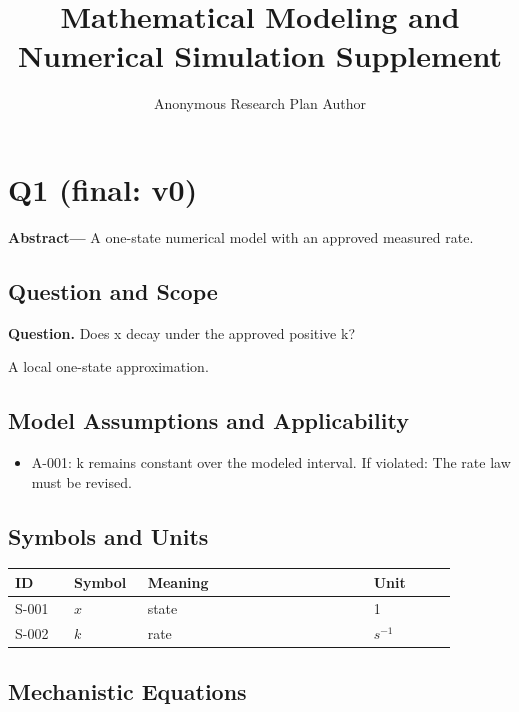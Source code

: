 \documentclass[11pt]{article}
\title{Mathematical Modeling and Numerical Simulation Supplement}
\author{Anonymous Research Plan Author}
\date{}
\begin{document}
\maketitle

\section{Q1 (final: v0)}

\noindent\textbf{Abstract—} A one-state numerical model with an approved measured rate.

\subsection{Question and Scope}

\noindent\textbf{Question.} Does x decay under the approved positive k?



A local one-state approximation.

\subsection{Model Assumptions and Applicability}

\begin{itemize}
\item A-001: k remains constant over the modeled interval. If violated: The rate law must be revised.
\end{itemize}

\subsection{Symbols and Units}

\begin{center}
\small
\begin{tabular}{|p{0.12\linewidth}|p{0.15\linewidth}|p{0.46\linewidth}|p{0.17\linewidth}|}
\hline
ID & Symbol & Meaning & Unit \\ \hline
S-001 & $x$ & state & 1 \\ \hline
S-002 & $k$ & rate & $s^{-1}$ \\ \hline
\end{tabular}
\end{center}

\subsection{Mechanistic Equations}
\end{document}
